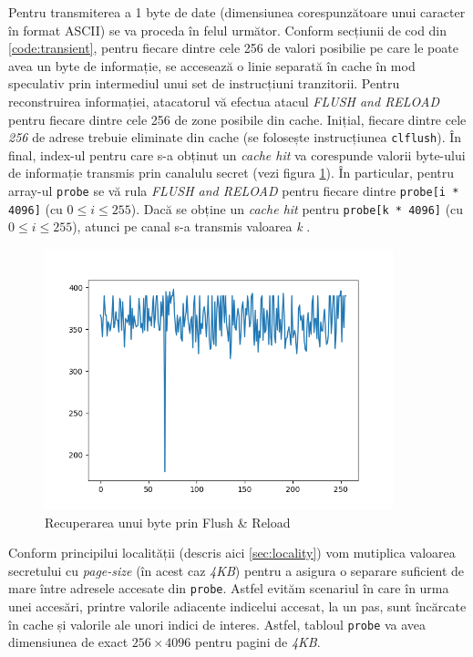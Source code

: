 Pentru transmiterea a 1 byte de date (dimensiunea corespunzătoare unui caracter
în format ASCII) se va proceda în felul următor. Conform secțiunii de cod din
\ref{code:transient}, pentru fiecare dintre cele 256 de valori posibilie pe
care le poate avea un byte de informație, se accesează o linie separată în
cache în mod speculativ prin intermediul unui set de instrucțiuni tranzitorii.
Pentru reconstruirea informației, atacatorul vă efectua atacul \emph{FLUSH and
RELOAD} pentru fiecare dintre cele 256 de zone posibile din cache. Inițial,
fiecare dintre cele \emph{256} de adrese trebuie eliminate din cache (se
folosește instrucțiunea \texttt{clflush}). În final, index-ul pentru care s-a
obținut un \emph{cache hit} va corespunde valorii byte-ului de informație
transmis prin canalulu secret (vezi figura \ref{fig:flush_reload}). În
particular, pentru array-ul \texttt{probe} se vă rula \emph{FLUSH and RELOAD}
pentru fiecare dintre \texttt{probe[i * 4096]} (cu $0 \leq i \leq 255$). Dacă
se obține un \emph{cache hit} pentru \texttt{probe[k * 4096]} (cu $0 \leq i \leq
255$), atunci pe canal s-a transmis valoarea \emph{k} \cite{meltdown2018}. 

\begin{figure}[ht]
	\centering
	\includegraphics[width=0.9\textwidth]{images/flush_reload_hit.png}
  \caption{Recuperarea unui byte prin Flush \& Reload}
  \label{fig:flush_reload}
\end{figure}

Conform principilui localității (descris aici \ref{sec:locality}) vom mutiplica
valoarea secretului cu \emph{page-size} (în acest caz \emph{4KB}) pentru a
asigura o separare suficient de mare între adresele accesate din
\texttt{probe}. Astfel evităm scenariul în care în urma unei accesări, printre
valorile adiacente indicelui accesat, la un pas, sunt încărcate în cache și
valorile ale unori indici de interes. Astfel, tabloul \texttt{probe} va avea
dimensiunea de exact $256 \times 4096$ pentru pagini de \emph{4KB}.


